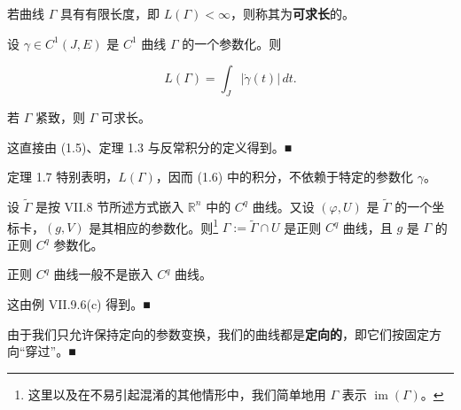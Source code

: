 若曲线 $ \Gamma $ 具有有限长度，即 $ L(\Gamma) < \infty $，则称其为\textbf{可求长}的。

\begin{theorem}

设 $ \gamma \in C^{1}(J,E) $ 是 $ C^{1} $ 曲线 $ \Gamma $ 的一个参数化。则

\begin{equation}
L(\Gamma) = \int_J |\dot{\gamma}(t)|\,dt .\tag{1.6}
\end{equation}

若 $ \Gamma $ 紧致，则 $ \Gamma $ 可求长。

\proofhead
这直接由 (1.5)、定理 1.3 与反常积分的定义得到。\nobreak\hspace{0.35em}■
\end{theorem}

\begin{remark}

\begin{items}
\item

定理 1.7 特别表明，$ L(\Gamma) $，因而 (1.6) 中的积分，不依赖于特定的参数化 $ \gamma $。

\item

设 $ \tilde{\Gamma} $ 是按 VII.8 节所述方式嵌入 $ \mathbb{R}^{n} $ 中的 $ C^{q} $ 曲线。又设 $ (\varphi,U) $ 是 $ \tilde{\Gamma} $ 的一个坐标卡，$ (g,V) $ 是其相应的参数化。则\footnote{这里以及在不易引起混淆的其他情形中，我们简单地用 $ \Gamma $ 表示 $ \operatorname{im}(\Gamma) $。} $ \Gamma := \tilde{\Gamma} \cap U $ 是正则 $ C^{q} $ 曲线，且 $ g $ 是 $ \Gamma $ 的正则 $ C^{q} $ 参数化。

\item

正则 $ C^{q} $ 曲线一般不是嵌入 $ C^{q} $ 曲线。

\proofhead
这由例 VII.9.6(c) 得到。\nobreak\hspace{0.35em}■
\item

由于我们只允许保持定向的参数变换，我们的曲线都是\textbf{定向的}，即它们按固定方向“穿过”。\nobreak\hspace{0.35em}■

\end{items}

\end{remark}

